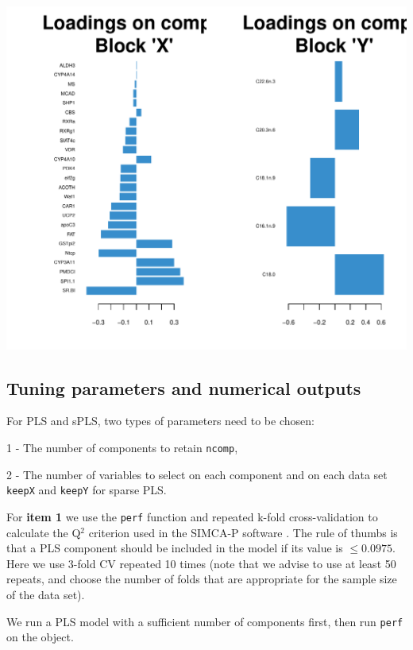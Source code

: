 \documentclass[]{book}
\newenvironment{Shaded}{\begin{snugshade}}{\end{snugshade}}
\newcommand{\CommentTok}[1]{\textcolor[rgb]{0.56,0.35,0.01}{\textit{#1}}}
\newcommand{\DataTypeTok}[1]{\textcolor[rgb]{0.13,0.29,0.53}{#1}}
\newcommand{\DecValTok}[1]{\textcolor[rgb]{0.00,0.00,0.81}{#1}}
\newcommand{\FloatTok}[1]{\textcolor[rgb]{0.00,0.00,0.81}{#1}}
\newcommand{\KeywordTok}[1]{\textcolor[rgb]{0.13,0.29,0.53}{\textbf{#1}}}
\newcommand{\NormalTok}[1]{#1}
\newcommand{\OperatorTok}[1]{\textcolor[rgb]{0.81,0.36,0.00}{\textbf{#1}}}
\newcommand{\OtherTok}[1]{\textcolor[rgb]{0.56,0.35,0.01}{#1}}
\newcommand{\StringTok}[1]{\textcolor[rgb]{0.31,0.60,0.02}{#1}}
\begin{document}
\begin{center}\includegraphics[width=0.5\linewidth,]{Figures/05-pls-plotLoadings-1-1} \end{center}

\hypertarget{tuning:PLS}{%
\subsection{Tuning parameters and numerical outputs}\label{tuning:PLS}}

For PLS and sPLS, two types of parameters need to be chosen:

1 - The number of components to retain \texttt{ncomp},

2 - The number of variables to select on each component and on each data set \texttt{keepX} and \texttt{keepY} for sparse PLS.

For \textbf{item 1} we use the \texttt{perf} function and repeated k-fold cross-validation to calculate the Q\(^2\) criterion used in the SIMCA-P software \citep{Ume96}. The rule of thumbs is that a PLS component should be included in the model if its value is \(\leq 0.0975\). Here we use 3-fold CV repeated 10 times (note that we advise to use at least 50 repeats, and choose the number of folds that are appropriate for the sample size of the data set).

We run a PLS model with a sufficient number of components first, then run \texttt{perf} on the object.

\begin{Shaded}
\end{Shaded}
\end{document}
